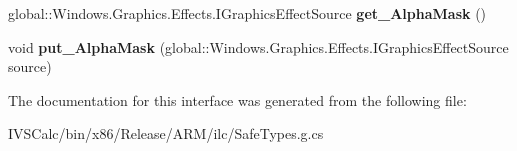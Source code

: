 \begin{DoxyCompactItemize}
global\+::\+Windows.\+Graphics.\+Effects.\+I\+Graphics\+Effect\+Source {\bfseries get\+\_\+\+Alpha\+Mask} ()
\item 
\mbox{\label{interface_microsoft_1_1_graphics_1_1_canvas_1_1_effects_1_1_i_alpha_mask_effect_a1057d37b21df4170ef6ae26c9fa68624}} 
void {\bfseries put\+\_\+\+Alpha\+Mask} (global\+::\+Windows.\+Graphics.\+Effects.\+I\+Graphics\+Effect\+Source source)
\end{DoxyCompactItemize}


The documentation for this interface was generated from the following file\+:\begin{DoxyCompactItemize}
\item 
I\+V\+S\+Calc/bin/x86/\+Release/\+A\+R\+M/ilc/Safe\+Types.\+g.\+cs\end{DoxyCompactItemize}
